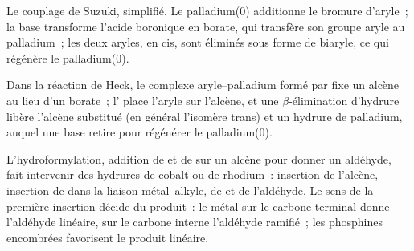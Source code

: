 \begin{omfigure}

{\small Le couplage de Suzuki, simplifié. Le palladium(0) additionne le bromure d'aryle~; la base
transforme l'acide boronique en borate, qui transfère son groupe aryle au palladium~; les deux
aryles, en cis, sont éliminés sous forme de biaryle, ce qui régénère le palladium(0).}
\end{omfigure}

Dans la réaction de Heck, le complexe aryle--palladium formé par  fixe un
alcène au lieu d'un borate~; l' place l'aryle sur l'alcène, et une
$\beta$-élimination d'hydrure libère l'alcène substitué (en général l'isomère trans)
et un hydrure de palladium, auquel une base retire  pour régénérer le palladium(0).

L'hydroformylation, addition de  et de  sur un alcène pour donner un aldéhyde,
fait intervenir des hydrures de cobalt ou de rhodium~: insertion de l'alcène, insertion de 
dans la liaison métal--alkyle,  de  et  de
l'aldéhyde. Le sens de la première insertion décide du produit~: le métal sur le
carbone terminal donne l'aldéhyde linéaire, sur le carbone interne l'aldéhyde ramifié~; les phosphines
encombrées favorisent le produit linéaire.

